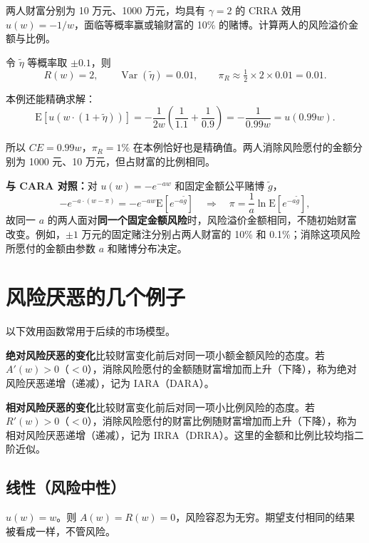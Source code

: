 \begin{tcolorbox}[example,title=课堂例题：相同财富比例的风险]
\begin{question}
两人财富分别为 10 万元、1000 万元，均具有 $\gamma=2$ 的 CRRA 效用 $u(w)=-1/w$，面临等概率赢或输财富的 10\% 的赌博。计算两人的风险溢价金额与比例。
\end{question}
\begin{solution}[blank-type=manual,blank-vsep=5\baselineskip]
令 $\tilde\eta$ 等概率取 $\pm0.1$，则
\[
 R(w)=2,\qquad \operatorname{Var}(\tilde\eta)=0.01,\qquad
 \pi_R\approx\tfrac12\times2\times0.01=0.01.
\]

本例还能精确求解：
\[
 \mathrm E[u(w\cdot(1+\tilde\eta))]
 =-\frac{1}{2w}\left(\frac1{1.1}+\frac1{0.9}\right)
 =-\frac{1}{0.99w}=u(0.99w).
\]

所以 $CE=0.99w$，$\pi_R=1\%$ 在本例恰好也是精确值。两人消除风险愿付的金额分别为 1000 元、10 万元，但占财富的比例相同。
\end{solution}
\end{tcolorbox}

\textbf{与 CARA 对照：}对 $u(w)=-e^{-aw}$ 和固定金额公平赌博 $\tilde g$，
\[
 -e^{-a\cdot(w-\pi)}=-e^{-aw}\mathrm E[e^{-a\tilde g}]
 \quad\Longrightarrow\quad
 \pi=\frac1a\ln\mathrm E[e^{-a\tilde g}],
\]
故同一 $a$ 的两人面对\textbf{同一个固定金额风险}时，风险溢价金额相同，不随初始财富改变。例如，$\pm1$ 万元的固定赌注分别占两人财富的 10\% 和 0.1\%；消除这项风险所愿付的金额由参数 $a$ 和赌博分布决定。

\section{风险厌恶的几个例子}\label{sec:wj-seven-4}
以下效用函数常用于后续的市场模型。
\hypertarget{wj-risk-aversion-wealth-changes}{}
\begin{tcolorbox}[knowledge,title=风险厌恶随财富的变化]
\textbf{绝对风险厌恶的变化}\quad 比较财富变化前后对同一项小额金额风险的态度。若 $A'(w)>0$（$<0$），消除风险愿付的金额随财富增加而上升（下降），称为绝对风险厌恶递增（递减），记为 IARA（DARA）。

\textbf{相对风险厌恶的变化}\quad 比较财富变化前后对同一项小比例风险的态度。若 $R'(w)>0$（$<0$），消除风险愿付的财富比例随财富增加而上升（下降），称为相对风险厌恶递增（递减），记为 IRRA（DRRA）。这里的金额和比例比较均指二阶近似。
\end{tcolorbox}

\subsection{线性（风险中性）}
\begin{tcolorbox}[knowledge]
$u(w)=w$。则 $A(w)=R(w)=0$，风险容忍为无穷。期望支付相同的结果被看成一样，不管风险。
\end{tcolorbox}

